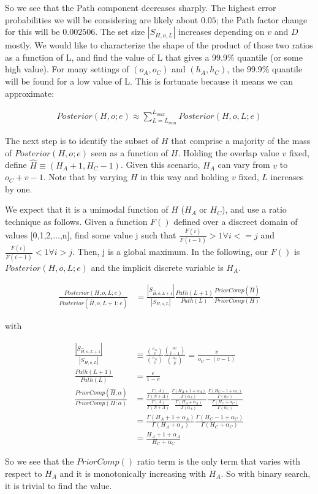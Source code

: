 \documentclass{article}
\begin{document}
So we see that the Path component decreases sharply.  The highest
error probabilities we will be considering are likely about $0.05$;
the Path factor change for this will be $0.002506$. The set size
$|S_{H,o,L}|$ increases depending on $v$ and $D$ mostly. We would like
to characterize the shape of the product of those two ratios as a
function of L, and find the value of L that gives a 99.9\% quantile
(or some high value).  For many settings of $(o_A, o_C)$ and $(h_A,
h_C)$, the 99.9\% quantile will be found for a low value of L.  This
is fortunate because it means we can approximate:

\begin{align}
  Posterior(H,o;e) \approx \sum_{L=L_{min}}^{L_{max}} Posterior(H,o,L;e)
\end{align}

The next step is to identify the subset of $H$ that comprise a
majority of the mass of $Posterior(H,o;e)$ seen as a function of
$H$. Holding the overlap value $v$ fixed, define $\hat{H} \equiv (H_A
+ 1, H_C -1)$.  Given this scenario, $H_A$ can vary from $v$ to $o_C +
v - 1$. Note that by varying $H$ in this way and holding $v$ fixed,
$L$ increases by one.

We expect that it is a unimodal function of $H$ ($H_A$ or $H_C$), and
use a ratio technique as follows.  Given a function $F()$ defined over
a discreet domain of values [0,1,2,...,n], find some value j such that
$\frac{F(i)}{F(i-1)} > 1 \forall i <= j$ and $\frac{F(i)}{F(i-1)} <
1 \forall i > j$.  Then, j is a global maximum. In the following, our
$F()$ is $Posterior(H,o,L;e)$ and the implicit discrete variable is
$H_A$.

\begin{align}
  \frac{Posterior(H,o,L;e)}{Posterior(\hat{H},o,L+1;e)} & =
  \frac{|S_{\hat{H},o,L+1}|}{|S_{H,o,L}|}
  \frac{Path(L+1)}{Path(L)}
  \frac{PriorComp(\hat{H})}{PriorComp(H)} \nonumber  
\end{align}

with

\begin{align}
  \frac{|S_{\hat{H},o,L+1}|}{|S_{H,o,L}|}
  & \equiv
  \frac{{o_A \choose v}}{{o_A \choose v}}
  \frac{{o_C \choose {\bar{v}-1}}}{{o_C \choose \bar{v}}}
  =
  \frac{\bar{v}}{o_C - (\bar{v} - 1)} \\[3ex]
  \frac{Path(L+1)}{Path(L)}
  & =
  \frac{e}{1 - e} \\[3ex]
  \frac{PriorComp(\hat{H};\alpha)}{PriorComp(H;\alpha)} & =
  \frac{\frac{\Gamma(A)}{\Gamma(N+A)}}{\frac{\Gamma(A)}{\Gamma(N+A)}}
  \frac{ \frac{\Gamma(H_A+1+\alpha_A)}{\Gamma(\alpha_A)}}{
    \frac{\Gamma(H_A+\alpha_A)}{\Gamma(\alpha_A)} } \frac{
    \frac{\Gamma(H_C-1+\alpha_C)}{\Gamma(\alpha_C)} }{
    \frac{\Gamma(H_C+\alpha_C)}{\Gamma(\alpha_C)} } \nonumber \\[2ex]
  & =
  \frac{\Gamma(H_A + 1 + \alpha_A)}{\Gamma(H_A + \alpha_A)}
  \frac{\Gamma(H_C - 1 + \alpha_C)}{\Gamma(H_C + \alpha_C)} \nonumber \\[2ex]
  & =
  \frac{H_A + 1 + \alpha_A}{H_C + \alpha_C}
\end{align}

So we see that the $PriorComp()$ ratio term is the only term that
varies with respect to $H_A$ and it is monotonically increasing with
$H_A$.  So with binary search, it is trivial to find the value.
\end{document}
